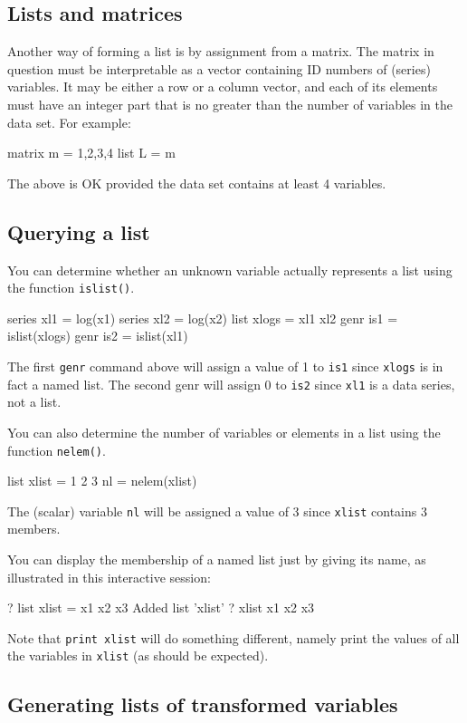 \subsection{Lists and matrices}

Another way of forming a list is by assignment from a matrix.  The
matrix in question must be interpretable as a vector containing ID
numbers of (series) variables.  It may be either a row or a column
vector, and each of its elements must have an integer part that is
no greater than the number of variables in the data set.  For example:
%
\begin{code}
matrix m = {1,2,3,4}
list L = m
\end{code}
%
The above is OK provided the data set contains at least 4 variables.

\subsection{Querying a list}

You can determine whether an unknown variable actually represents a list
using the function \texttt{islist()}.
%
\begin{code}
series xl1 = log(x1)
series xl2 = log(x2)
list xlogs = xl1 xl2
genr is1 = islist(xlogs)
genr is2 = islist(xl1)
\end{code}

The first \texttt{genr} command above will assign a value of 1 to
\texttt{is1} since \texttt{xlogs} is in fact a named list.  The second
genr will assign 0 to \texttt{is2} since \texttt{xl1} is a data
series, not a list.  

You can also determine the number of variables or elements in a list
using the function \texttt{nelem()}.
%
\begin{code}
list xlist = 1 2 3
nl = nelem(xlist)
\end{code}

The (scalar) variable \texttt{nl} will be assigned a value of 3 since
\texttt{xlist} contains 3 members.

You can display the membership of a named list just by giving its name,
as illustrated in this interactive session:
%
\begin{code}
? list xlist = x1 x2 x3
Added list 'xlist'
? xlist
 x1 x2 x3
\end{code}
%
Note that \texttt{print xlist} will do something different, namely
print the values of all the variables in \texttt{xlist} (as should be
expected).

\subsection{Generating lists of transformed variables}

